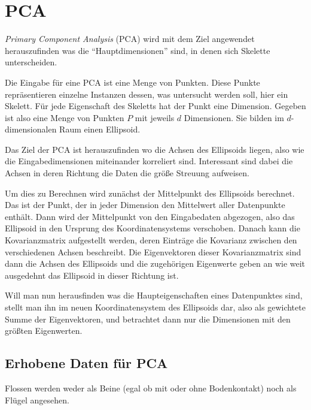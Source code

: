 \section{PCA}

 \emph{Primary Component Analysis} (PCA) wird mit dem Ziel angewendet herauszufinden was die "`Hauptdimensionen"' sind, in denen sich Skelette unterscheiden.
 
 Die Eingabe für eine PCA ist eine Menge von Punkten. Diese Punkte repräsentieren einzelne Instanzen dessen, was untersucht werden soll, hier ein Skelett. Für jede Eigenschaft des Skeletts hat der Punkt eine Dimension. Gegeben ist also eine Menge von Punkten $P$ mit jeweils $d$ Dimensionen. Sie bilden im $d$-dimensionalen Raum einen Ellipsoid.
 
 Das Ziel der PCA ist herauszufinden wo die Achsen des Ellipsoids liegen, also wie die Eingabedimensionen miteinander korreliert sind. Interessant sind dabei die Achsen in deren Richtung die Daten die größe Streuung aufweisen.
 
 Um dies zu Berechnen wird zunächst der Mittelpunkt des Ellipsoids berechnet. Das ist der Punkt, der in jeder Dimension den Mittelwert aller Datenpunkte enthält. Dann wird der Mittelpunkt von den Eingabedaten abgezogen, also das Ellipsoid in den Ursprung des Koordinatensystems verschoben. Danach kann die Kovarianzmatrix aufgestellt werden, deren Einträge die Kovarianz zwischen den verschiedenen Achsen beschreibt.
 Die Eigenvektoren dieser Kovarianzmatrix sind dann die Achsen des Ellipsoids und die zugehörigen Eigenwerte geben an wie weit ausgedehnt das Ellipsoid in dieser Richtung ist.
 
 Will man nun herausfinden was die Haupteigenschaften eines Datenpunktes sind, stellt man ihn im neuen Koordinatensystem des Ellipsoids dar, also als gewichtete Summe der Eigenvektoren, und betrachtet dann nur die Dimensionen mit den größten Eigenwerten.

 \subsection{Erhobene Daten für PCA}
 
 Flossen werden weder als Beine (egal ob mit oder ohne Bodenkontakt) noch als Flügel angesehen. 
 
